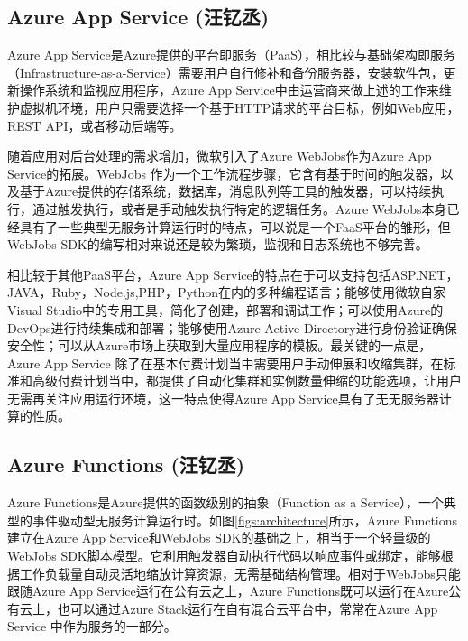 \documentclass[11pt]{article}
\begin{document}
\subsection{Azure App Service (汪钇丞)}
Azure App Service是Azure提供的平台即服务（PaaS），相比较与基础架构即服务（Infrastructure-as-a-Service）需要用户自行修补和备份服务器，安装软件包，更新操作系统和监视应用程序，Azure App Service中由运营商来做上述的工作来维护虚拟机环境，用户只需要选择一个基于HTTP请求的平台目标，例如Web应用，REST API，或者移动后端等。

随着应用对后台处理的需求增加，微软引入了Azure WebJobs作为Azure App Service的拓展。WebJobs 作为一个工作流程步骤，它含有基于时间的触发器，以及基于Azure提供的存储系统，数据库，消息队列等工具的触发器，可以持续执行，通过触发执行，或者是手动触发执行特定的逻辑任务。Azure WebJobs本身已经具有了一些典型无服务计算运行时的特点，可以说是一个FaaS平台的雏形，但WebJobs SDK的编写相对来说还是较为繁琐，监视和日志系统也不够完善。

相比较于其他PaaS平台，Azure App Service的特点在于可以支持包括ASP.NET，JAVA，Ruby，Node.js,PHP，Python在内的多种编程语言；能够使用微软自家Visual Studio中的专用工具，简化了创建，部署和调试工作；可以使用Azure的DevOps进行持续集成和部署；能够使用Azure Active Directory进行身份验证确保安全性；可以从Azure市场上获取到大量应用程序的模板。最关键的一点是，Azure App Service 除了在基本付费计划当中需要用户手动伸展和收缩集群，在标准和高级付费计划当中，都提供了自动化集群和实例数量伸缩的功能选项，让用户无需再关注应用运行环境，这一特点使得Azure App Service具有了无无服务器计算的性质。


\subsection{Azure Functions (汪钇丞)}
Azure Functions是Azure提供的函数级别的抽象（Function as a Service），一个典型的事件驱动型无服务计算运行时。如图\ref{figs:architecture}所示，Azure Functions建立在Azure App Service和WebJobs SDK的基础之上，相当于一个轻量级的WebJobs SDK脚本模型。它利用触发器自动执行代码以响应事件或绑定，能够根据工作负载量自动灵活地缩放计算资源，无需基础结构管理。相对于WebJobs只能跟随Azure App Service运行在公有云之上，Azure Functions既可以运行在Azure公有云上，也可以通过Azure Stack运行在自有混合云平台中，常常在Azure App Service 中作为服务的一部分。
\end{document}

